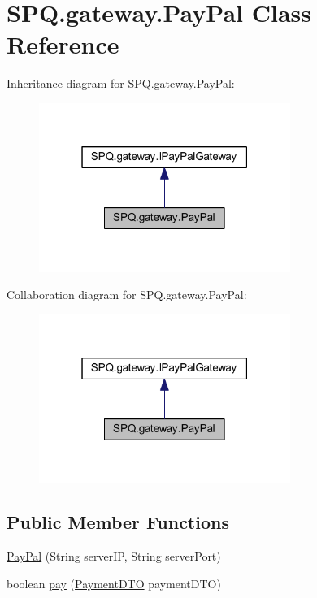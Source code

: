 \hypertarget{class_s_p_q_1_1gateway_1_1_pay_pal}{}\section{S\+P\+Q.\+gateway.\+Pay\+Pal Class Reference}
\label{class_s_p_q_1_1gateway_1_1_pay_pal}


Inheritance diagram for S\+P\+Q.\+gateway.\+Pay\+Pal\+:
\nopagebreak
\begin{figure}[H]
\begin{center}
\leavevmode
\includegraphics[width=232pt]{class_s_p_q_1_1gateway_1_1_pay_pal__inherit__graph}
\end{center}
\end{figure}


Collaboration diagram for S\+P\+Q.\+gateway.\+Pay\+Pal\+:
\nopagebreak
\begin{figure}[H]
\begin{center}
\leavevmode
\includegraphics[width=232pt]{class_s_p_q_1_1gateway_1_1_pay_pal__coll__graph}
\end{center}
\end{figure}
\subsection*{Public Member Functions}
\begin{DoxyCompactItemize}
\item 
\mbox{\hyperlink{class_s_p_q_1_1gateway_1_1_pay_pal_ab34e6213b4dbfeccc87da6bcd486bbf3}{Pay\+Pal}} (String server\+IP, String server\+Port)
\item 
boolean \mbox{\hyperlink{class_s_p_q_1_1gateway_1_1_pay_pal_a4f12e3d9fd7cc1ebf54e885df464f1d4}{pay}} (\mbox{\hyperlink{class_s_p_q_1_1dto_1_1_payment_d_t_o}{Payment\+D\+TO}} payment\+D\+TO)
\end{DoxyCompactItemize}



